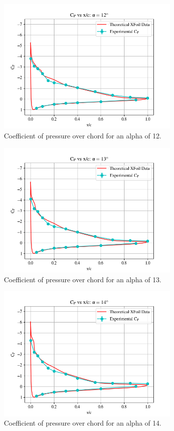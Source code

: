 \documentclass[11pt, letterpaper]{article}
\begin{document}
\begin{appendices}
\begin{figure}[!hpt]
        \centering        
        \includegraphics[width=0.8\textwidth]{Figures/C_p-a12.png}
        \caption{Coefficient of pressure over chord for an alpha of 12\degree.}
        \label{fig:C_p-a12}
\end{figure}

\begin{figure}[!hpt]
        \centering        
        \includegraphics[width=0.8\textwidth]{Figures/C_p-a13.png}
        \caption{Coefficient of pressure over chord for an alpha of 13\degree.}
        \label{fig:C_p-a13}
\end{figure}

\begin{figure}[!hpt]
        \centering        
        \includegraphics[width=0.8\textwidth]{Figures/C_p-a14.png}
        \caption{Coefficient of pressure over chord for an alpha of 14\degree.}
        \label{fig:C_p-a14}
\end{figure}


\end{appendices}
\end{document}
